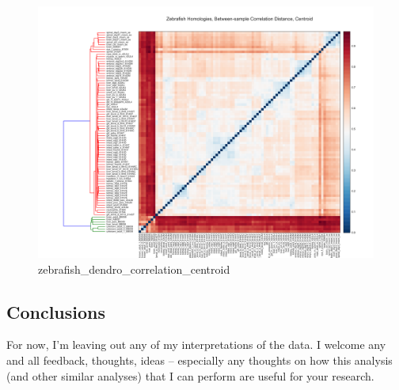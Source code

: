 \documentclass{article}
\begin{document}
\begin{figure}[htbp]
\centering
\includegraphics{zebrafish_dendro_correlation_centroid.svg}
\caption{zebrafish\_dendro\_correlation\_centroid}
\end{figure}


    \subsection{Conclusions}


    For now, I'm leaving out any of my interpretations of the data. I
welcome any and all feedback, thoughts, ideas -- especially any thoughts
on how this analysis (and other similar analyses) that I can perform are
useful for your research.


    
    
    
    
\end{document}
